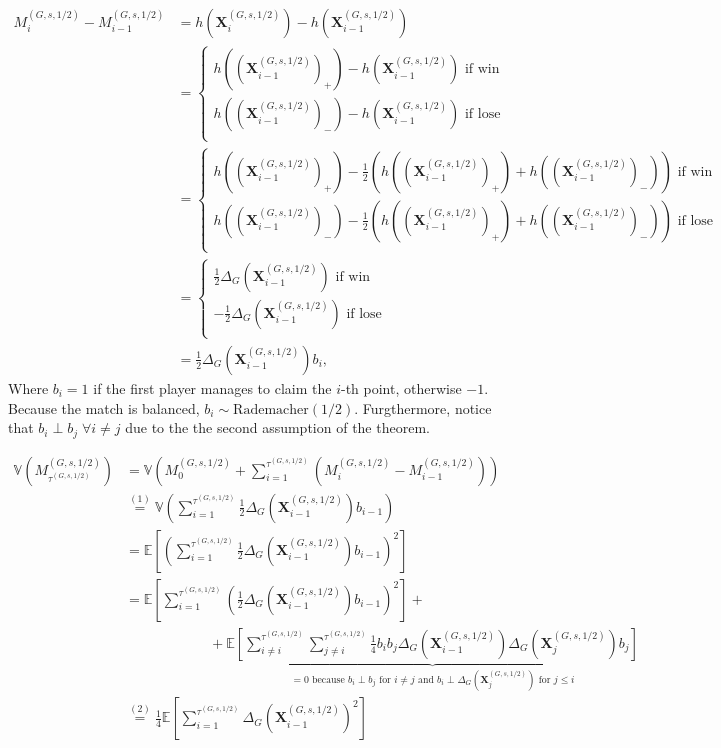 \documentclass{article}
\newcommand{\var}{\mathbb{V}}
\newcommand{\x}{\mathbf{X}}
\newcommand{\xghalf}{\x^{\left(G, s, 1/2\right)}}
\newcommand{\taughalf}{{\tau^{\left(G, s, 1/2\right)}}}
\newcommand{\mghalf}{\m^{\left(G, s, 1/2\right)}}
\newcommand{\m}{M}
\newcommand{\ex}{\mathbb{E}}
\newcommand{\h}{h}
\begin{document}
\begin{align*}
    \mghalf_i - \mghalf_{i-1} &= \h\left(\xghalf_i\right) - \h\left(\xghalf_{i - 1}\right) \\
    &= \begin{cases}
    \h\left(\left(\xghalf_{i - 1}\right)_+\right) - \h\left(\xghalf_{i - 1}\right) \text{ if win}\\
    \h\left(\left(\xghalf_{i - 1}\right)_-\right) - \h\left(\xghalf_{i - 1}\right) \text{ if lose}\\
    \end{cases}\\
    &= \begin{cases}
    \h\left(\left(\xghalf_{i - 1}\right)_+\right) - \frac12\left(\h\left(\left(\xghalf_{i - 1}\right)_+\right) + \h\left(\left(\xghalf_{i - 1}\right)_-\right)\right) \text{ if win}\\
    \h\left(\left(\xghalf_{i - 1}\right)_-\right) - \frac12\left(\h\left(\left(\xghalf_{i - 1}\right)_+\right) + \h\left(\left(\xghalf_{i - 1}\right)_-\right)\right)  \text{ if lose}\\
    \end{cases}\\
    &= \begin{cases}
    \frac12 \Delta_G\left(\xghalf_{i - 1}\right) \text{ if win}\\
    -\frac12 \Delta_G\left(\xghalf_{i - 1}\right)  \text{ if lose}\\
    \end{cases}\\
    &= \frac12 \Delta_G\left(\xghalf_{i - 1}\right)b_{i},
\end{align*}
Where $b_i = 1$ if the first player manages to claim the $i$-th point, otherwise $-1$. Because the match is balanced, $b_i \sim \text{Rademacher}(1/2)$. Furgthermore, notice that $b_i \perp b_j\;\forall i \neq j$ due to the the second assumption of the theorem.

\begin{align*}
    \var \left(\mghalf_\taughalf\right) &= \var\left(\mghalf_0 + \sum_{i=1}^{\taughalf} \left(\mghalf_i - \mghalf_{i-1}\right)\right) \\
    &\overset{(1)}{=}\var\left(\sum_{i=1}^{\taughalf}\frac12 \Delta_G\left(\xghalf_{i-1}\right)  b_{i-1} \right)\\
    &=\ex\left[\left(\sum_{i=1}^{\taughalf}\frac12 \Delta_G\left(\xghalf_{i-1}\right)  b_{i-1} \right)^2\right]\\
    &=\ex\left[\sum_{i=1}^{\taughalf}\left(\frac12 \Delta_G\left(\xghalf_{i-1}\right)  b_{i-1} \right)^2 \right]+ \\ &\quad\quad\quad\quad\quad\quad + \underbrace{\ex\left[\sum_{i\neq i}^{\taughalf}\sum_{j\neq i}^{\taughalf}\frac14 b_{i}b_{j} \Delta_G\left(\xghalf_{i-1}
    \right) \Delta_G\left(\xghalf_{j}\right)  b_{j} \right]}_{= 0 \text{ because } b_{i} \perp b_{j} \text{ for } i \neq j \text{ and } b_i \perp \Delta_G\left(\xghalf_{j}\right) \text { for } j \leq i}\\
    &\overset{(2)}{=}\frac14\ex\left[\sum_{i=1}^{\taughalf}\Delta_G\left(\xghalf_{i-1}\right)^2 \right]\\
\end{align*}
\end{document}
